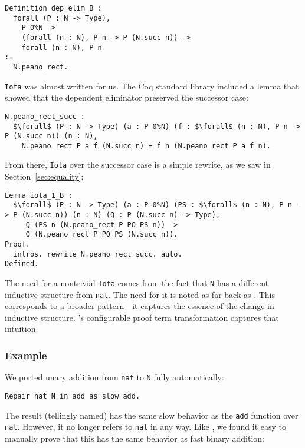 \begin{lstlisting}
Definition dep_elim_B :
  forall (P : N -> Type),
    P 0%N ->
    (forall (n : N), P n -> P (N.succ n)) ->
    forall (n : N), P n
:=
  N.peano_rect.
\end{lstlisting}
\lstinline{Iota} was almost written for us.
The Coq standard library included a lemma that showed that the dependent eliminator preserved the successor case:

\begin{lstlisting}
N.peano_rect_succ :
  $\forall$ (P : N -> Type) (a : P 0%N) (f : $\forall$ (n : N), P n -> P (N.succ n)) (n : N),
    N.peano_rect P a f (N.succ n) = f n (N.peano_rect P a f n).
\end{lstlisting}
From there, \lstinline{Iota} over the successor case is a simple rewrite, as we saw in Section~\ref{sec:equality}:

\begin{lstlisting}
Lemma iota_1_B :
  $\forall$ (P : N -> Type) (a : P 0%N) (PS : $\forall$ (n : N), P n -> P (N.succ n)) (n : N) (Q : P (N.succ n) -> Type),
     Q (PS n (N.peano_rect P PO PS n)) ->
     Q (N.peano_rect P PO PS (N.succ n)).
Proof.
  intros. rewrite N.peano_rect_succ. auto.
Defined.
\end{lstlisting}

The need for a nontrivial \lstinline{Iota} comes from the fact that \lstinline{N} has a different
inductive structure from \lstinline{nat}.
The need for it is noted as far back as \citet{magaud2000changing}.
This corresponds to a broader pattern---it captures the essence of the change in inductive structure.
\toolname's configurable proof term transformation captures that intuition.

\subsubsection{Example}

We ported unary addition from \lstinline{nat} to \lstinline{N} fully automatically:

\begin{lstlisting}
Repair nat N in add as slow_add.
\end{lstlisting}
The result (tellingly named) has the same slow behavior as the \lstinline{add} function over \lstinline{nat}.
However, it no longer refers to \lstinline{nat} in any way.
Like \citet{magaud2000changing}, we found it easy to manually prove that
this has the same behavior as fast binary addition:

